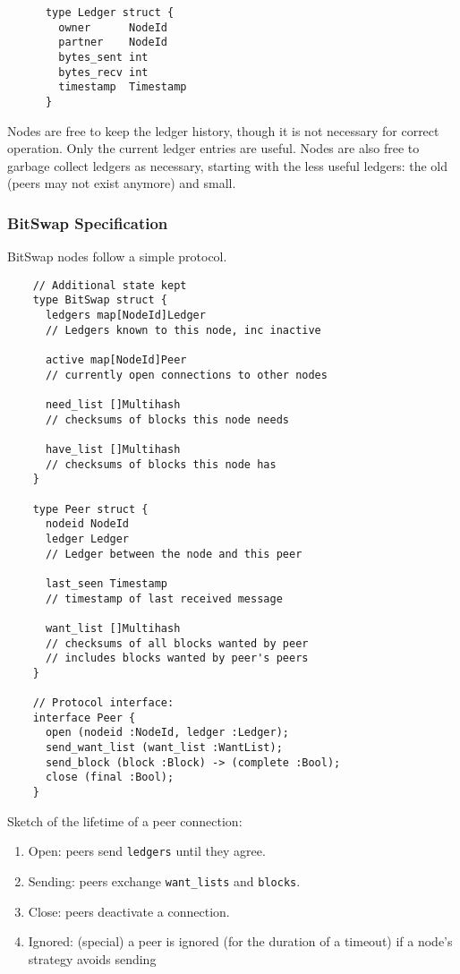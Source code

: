 \documentclass{sig-alternate}
\begin{document}
\begin{verbatim}
      type Ledger struct {
        owner      NodeId
        partner    NodeId
        bytes_sent int
        bytes_recv int
        timestamp  Timestamp
      }
\end{verbatim}

Nodes are free to keep the ledger history, though it is not necessary for
correct operation. Only the current ledger entries are useful. Nodes are
also free to garbage collect ledgers as necessary, starting with the less
useful ledgers: the old (peers may not exist anymore) and small.

\subsubsection{BitSwap Specification}

BitSwap nodes follow a simple protocol.

\begin{verbatim}
    // Additional state kept
    type BitSwap struct {
      ledgers map[NodeId]Ledger
      // Ledgers known to this node, inc inactive

      active map[NodeId]Peer
      // currently open connections to other nodes

      need_list []Multihash
      // checksums of blocks this node needs

      have_list []Multihash
      // checksums of blocks this node has
    }

    type Peer struct {
      nodeid NodeId
      ledger Ledger
      // Ledger between the node and this peer

      last_seen Timestamp
      // timestamp of last received message

      want_list []Multihash
      // checksums of all blocks wanted by peer
      // includes blocks wanted by peer's peers
    }

    // Protocol interface:
    interface Peer {
      open (nodeid :NodeId, ledger :Ledger);
      send_want_list (want_list :WantList);
      send_block (block :Block) -> (complete :Bool);
      close (final :Bool);
    }
\end{verbatim}


Sketch of the lifetime of a peer connection:
\begin{enumerate}
  \item Open: peers send \texttt{ledgers} until they agree.
  \item Sending: peers exchange \texttt{want\_lists} and \texttt{blocks}.
  \item Close: peers deactivate a connection.
  \item Ignored: (special) a peer is ignored (for the duration of a timeout)
        if a node's strategy avoids sending

\end{enumerate}
\end{document}
